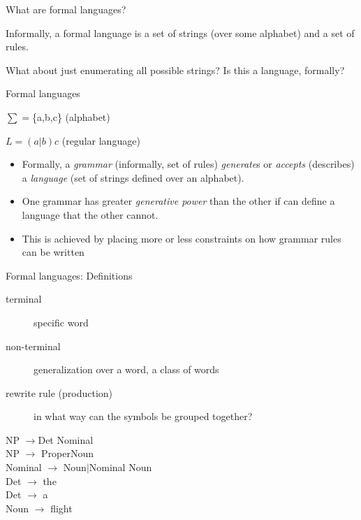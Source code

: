 \documentclass{beamer}
\begin{document}
\begin{frame}{What are formal languages?}

  Informally, a formal language is a set of strings (over some alphabet) and a set of rules.
  \vfill
  
  What about just enumerating all possible strings? Is this a language, formally?

\end{frame}

\begin{frame}{Formal languages}

$\sum=$\{a,b,c\} (alphabet)

$L=(a|b)c$ (regular language)
\vfill

\begin{itemize}
\item Formally, a \textit{grammar} (informally, set of rules)
  \textit{generate}s or \textit{accepts} (describes) a
  \textit{language} (set of strings defined over an alphabet).
\item One grammar has greater \textit{generative power} than the other
  if can define a language that the other cannot.
\item This is achieved by placing more or less constraints on how
  grammar rules can be written
\end{itemize}
\end{frame}

\begin{frame}{Formal languages: Definitions}

\begin{description}
\item[terminal] specific word
\item[non-terminal] generalization over a word, a class of words
\item[rewrite rule (production)] in what way can the symbols be grouped together?
\end{description}
\vfill

NP $\rightarrow$Det Nominal \\ 
NP $\rightarrow$ ProperNoun \\
Nominal $\rightarrow$ Noun$\vert$Nominal Noun \\
Det $\rightarrow$ the \\
Det $\rightarrow$ a \\
Noun $\rightarrow$ flight
\end{frame}
\end{document}
